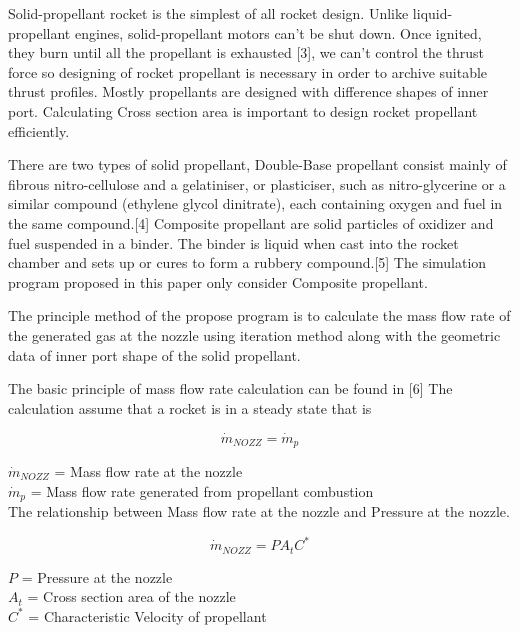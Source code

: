 \documentclass[conference]{IEEEtran}
\begin{document}
 Solid-propellant rocket is the simplest of all rocket design. Unlike liquid-propellant engines, solid-propellant motors can’t be shut down. Once ignited, they burn until all the propellant is exhausted [3],  we can’t control the thrust force so designing of rocket propellant is necessary in order to archive suitable thrust profiles. Mostly propellants are designed with difference shapes of inner port. Calculating Cross section area is important to design rocket propellant efficiently.
 
There are two types of solid propellant, Double-Base propellant consist mainly of fibrous nitro-cellulose and a gelatiniser, or plasticiser, such as nitro-glycerine or a similar compound (ethylene glycol dinitrate), each containing oxygen and fuel in the same compound.[4] Composite propellant are solid particles of oxidizer and fuel suspended in a binder. The binder is liquid when cast into the rocket chamber and sets up or cures to form a rubbery compound.[5] The simulation program proposed in this paper only consider Composite propellant.

The principle method of the propose program is to calculate the mass flow rate of the generated gas at the nozzle using iteration method along with the geometric data of inner port shape of the solid propellant.

The basic principle of mass flow rate calculation can be found in [6] The calculation assume that a rocket is in a steady state that is
\begin{center}
\begin{equation}
\dot{m}_{NOZZ} = \dot{m}_{p}
\end{equation}
\end{center}
$\dot{m}_{NOZZ}$ = Mass flow rate at the nozzle\\
$\dot{m}_{p}$ = Mass flow rate generated from propellant combustion\\		

The relationship between Mass flow rate at the nozzle and Pressure at the nozzle.
\begin{center}
\begin{equation}
\dot{m}_{NOZZ} = P{A}_tC^{*}
\end{equation}
\end{center}
$P$ = Pressure at the nozzle\\
${A}_t$ = Cross section area of the nozzle\\		
$C^{*}$ = Characteristic Velocity of propellant\\
\end{document}
